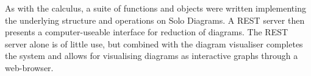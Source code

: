 As with the calculus, a suite of functions and objects were written implementing the underlying structure and operations on Solo Diagrams.
A REST server then presents a computer-useable interface for reduction of diagrams.
The REST server alone is of little use, but combined with the diagram visualiser completes the system and allows for visualising diagrams as interactive graphs through a web-browser.
